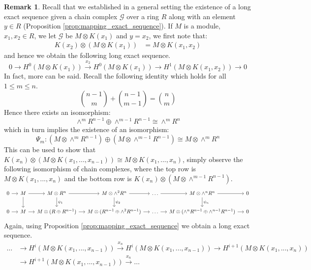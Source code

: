 \documentclass[12pt]{article}
\theoremstyle{plain}
\theoremstyle{definition}
\newtheorem{remark}[thm]{Remark}
\newcommand{\scr}[1]{\mathscr{#1}}
\newcommand{\lto}{\longrightarrow}
\begin{document}
	\begin{remark}\label{rmk:long_exact_sequence}
		Recall that we established in a general setting the existence of a long exact sequence given a chain complex $\scr{G}$ over a ring $R$ along with an element $y \in R$ (Proposition \ref{prop:mapping_exact_sequence}). If $M$ is a module, $x_1,x_2 \in R$, we let $\scr{G}$ be $M \otimes K(x_1)$ and $y = x_2$, we first note that:
		\begin{align*}
			K(x_2) \otimes (M \otimes K(x_1)) &= M \otimes K(x_1,x_2)
		\end{align*}
		and hence we obtain the following long exact sequence.
		\begin{equation}
			0 \lto H^0(M \otimes K(x_1)) \stackrel{x_2}{\lto} H^0(M \otimes K(x_1)) \lto H^1(M \otimes K(x_1,x_2)) \lto 0
		\end{equation}
		In fact, more can be said. Recall the following identity which holds for all $1 \leq m \leq n$.
		\begin{equation}
			{n-1 \choose m} + {n-1 \choose m-1} = {n \choose m}
		\end{equation}
		Hence there exists an isomorphism:
		\begin{equation}
			\wedge^{m}R^{n-1} \oplus \wedge^{m-1}R^{n-1} \cong \wedge^m R^n
		\end{equation}
		which in turn implies the existence of an isomorphism:
		\begin{equation}
			\Psi_m: (M \otimes \wedge^{m}R^{n-1}) \oplus (M \otimes \wedge^{m-1}R^{n-1}) \cong M \otimes \wedge^mR^n
		\end{equation}
		This can be used to show that $K(x_n) \otimes (M \otimes K(x_1,...,x_{n-1})) \cong M \otimes K(x_1,...,x_n)$, simply observe the following isomorphism of chain complexes, where the top row is $M \otimes K(x_1,...,x_n)$ and the bottom row is $K(x_n) \otimes (M \otimes \wedge^{m-1}R^{n-1})$.
		\begin{equation}
			\begin{tikzcd}[column sep = small]
				0\arrow[r] & M\arrow[r]\arrow[d] & M \otimes R^{n}\arrow[r]\arrow[d,"{\psi_1}"] & M \otimes \wedge^2 R^n\arrow[r]\arrow[d,"{\psi_2}"] & \hdots\arrow[r] & M \otimes \wedge^n R^n\arrow[r]\arrow[d,"{\psi_n}"] & 0\\
				0\arrow[r] & M\arrow[r] & M\otimes(R \oplus R^{n-1} )\arrow[r] & M \otimes ( R^{n-1} \oplus \wedge^2 R^{n-1})\arrow[r] & \hdots\arrow[r] & M \otimes (\wedge^{n}R^{n-1} \oplus \wedge^{n-1}R^{n-1})\arrow[r] & 0
			\end{tikzcd}
		\end{equation}
		Again, using Proposition \ref{prop:mapping_exact_sequence} we obtain a long exact sequence.
		\begin{align*}
			\hdots &\lto H^i(M \otimes K(x_1,...,x_{n-1})) \stackrel{x_n}{\lto} H^i(M \otimes K(x_1,...,x_{n-1})) \lto H^{i+1}(M \otimes K(x_1,...,x_n))\\
			&\lto H^{i+1}(M \otimes K(x_1,...,x_{n-1})) \stackrel{x_n}{\lto} \hdots
		\end{align*}
	\end{remark}
\end{document}
